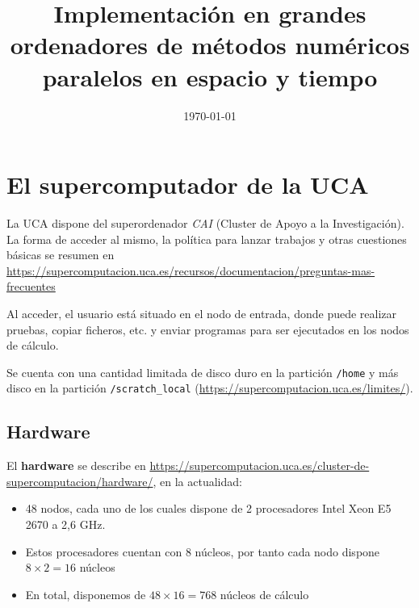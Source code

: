 \documentclass[11pt]{article}
\title{Implementación en grandes ordenadores de métodos numéricos paralelos en espacio y tiempo}
\date{\today}
\begin{document}
\maketitle

\section{El supercomputador de la UCA}
\label{sec:supercomputador-UCA}
La UCA dispone del superordenador \textit{CAI} (Cluster de Apoyo a la
Investigación).  La forma de acceder al mismo, la política para lanzar
trabajos y otras cuestiones básicas se resumen en
\url{https://supercomputacion.uca.es/recursos/documentacion/preguntas-mas-frecuentes}

Al acceder, el usuario está situado en el nodo de entrada, donde puede
realizar pruebas, copiar ficheros, etc. y enviar programas para ser
ejecutados en los nodos de cálculo.

Se cuenta con una cantidad limitada de disco duro en la partición
\texttt{/home} y más disco en la partición \texttt{/scratch\_local}
(\url{https://supercomputacion.uca.es/limites/}).

\subsection*{Hardware}
El \textbf{hardware} se describe en
\url{https://supercomputacion.uca.es/cluster-de-supercomputacion/hardware/},
en la actualidad:
\begin{itemize}
\item 48 nodos, cada uno de los cuales dispone de 2 procesadores Intel Xeon E5 2670 a 2,6 GHz.
\item Estos procesadores cuentan con 8 núcleos, por tanto cada nodo dispone $8\times 2=16$ núcleos
\item En total, disponemos de $48\times 16=768$ núcleos de cálculo
\end{itemize}
\end{document}

